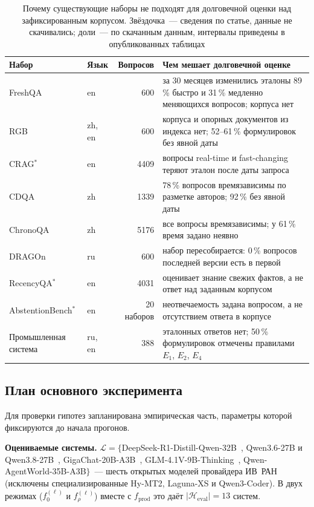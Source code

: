 \documentclass{article}
\newcommand{\Heval}{\mathcal{H}_{\mathrm{eval}}}
\newcommand{\Lm}{\mathcal{L}}
\newcommand{\fprod}{f_{\mathrm{prod}}}
\begin{document}
\begin{table}[t]
  \caption{Почему существующие наборы не подходят для долговечной оценки над зафиксированным корпусом. Звёздочка~--- сведения по статье, данные не скачивались; доли~--- по скачанным данным, интервалы приведены в опубликованных таблицах}
  \label{tab:datasets}
  \centering
  \small
  \begin{tabular}{@{}llrp{7.4cm}@{}}
    \toprule
    Набор & Язык & Вопросов & Чем мешает долговечной оценке \\
    \midrule
    FreshQA & en & 600 & за 30 месяцев изменились эталоны 89\,\% быстро и 31\,\% медленно меняющихся вопросов; корпуса нет \\
    RGB & zh, en & 600 & корпуса и опорных документов из индекса нет; 52--61\,\% формулировок без явной даты \\
    CRAG$^*$ & en & 4409 & вопросы real-time и fast-changing теряют эталон после даты запроса \\
    CDQA & zh & 1339 & 78\,\% вопросов времязависимы по разметке авторов; 92\,\% без явной даты \\
    ChronoQA & zh & 5176 & все вопросы времязависимы; у 61\,\% время задано неявно \\
    DRAGOn & ru & 600 & набор пересобирается: 0\,\% вопросов последней версии есть в первой \\
    RecencyQA$^*$ & en & 4031 & оценивает знание свежих фактов, а не ответ над заданным корпусом \\
    AbstentionBench$^*$ & en & 20 наборов & неотвечаемость задана вопросом, а не отсутствием ответа в корпусе \\
    Промышленная система & ru, en & 388 & эталонных ответов нет; 50\,\% формулировок отмечены правилами $E_1$, $E_2$, $E_4$ \\
    \bottomrule
  \end{tabular}
\end{table}

\subsection{План основного эксперимента}\label{sec:plan}

Для проверки гипотез запланирована эмпирическая часть, параметры которой фиксируются до начала прогонов.

\textbf{Оцениваемые системы.} $\Lm=\{$DeepSeek-R1-Distill-Qwen-32B~\cite{deepseek2025r1}, Qwen3.6-27B и Qwen3.8-27B~\cite{qwen2025qwen3}, GigaChat-20B-A3B~\cite{gigachat2025family}, GLM-4.1V-9B-Thinking~\cite{glm2024chatglm}, Qwen-AgentWorld-35B-A3B$\}$~--- шесть открытых моделей провайдера ИВ~РАН (исключены специализированные Hy-MT2, Laguna-XS и Qwen3-Coder). В двух режимах ($f_0^{(\ell)}$ и $f_\rho^{(\ell)}$) вместе с $\fprod$ это даёт $|\Heval|=13$ систем.
\end{document}
